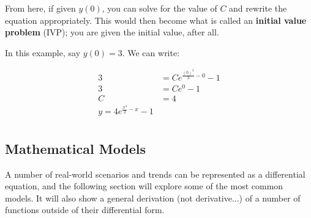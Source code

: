 \documentclass[12pt]{article}
\begin{document}
From here, if given $y(0)$, you can solve for the value of $C$ and rewrite the equation appropriately. This would then become what is called an \textbf{initial value problem} (IVP); you are given the initial value, after all. 

In this example, say $y(0) = 3$. We can write:

\begin{equation}
    \begin{split}
        3 &= Ce^{\frac{(0)^3}{3}-0}-1\\
        3 &= Ce^0-1\\
        C &= 4\\
        y = 4e^{\frac{x^3}{3}-x}-1\\
    \end{split}
\end{equation}

\subsection{Mathematical Models}

A number of real-world scenarios and trends can be represented as a differential equation, and the following section will explore some of the most common models. It will also show a general derivation (not derivative...) of a number of functions outside of their differential form. 
\end{document}
